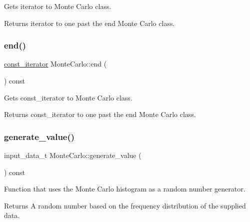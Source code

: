 Gets iterator to Monte Carlo class. \begin{DoxyReturn}{Returns}
iterator to one past the end Monte Carlo class. 
\end{DoxyReturn}
\mbox{\label{classMonteCarlo_a6e15e3a5a96163b8cc84ec9892c2e88b}} 
\subsubsection{\texorpdfstring{end()}{end()}\hspace{0.1cm}{\footnotesize\ttfamily [2/2]}}
{\footnotesize\ttfamily \hyperlink{classMonteCarlo_a74dc0884e3b02002956de4fb84a0bb01}{const\+\_\+iterator} Monte\+Carlo\+::end (\begin{DoxyParamCaption}{ }\end{DoxyParamCaption}) const\hspace{0.3cm}{\ttfamily [inline]}}

Gets const\+\_\+iterator to Monte Carlo class. \begin{DoxyReturn}{Returns}
const\+\_\+iterator to one past the end Monte Carlo class. 
\end{DoxyReturn}
\mbox{\label{classMonteCarlo_a32ac50ed9ba5bf78398681192ccfc301}} 
\subsubsection{\texorpdfstring{generate\+\_\+value()}{generate\_value()}}
{\footnotesize\ttfamily input\+\_\+data\+\_\+t Monte\+Carlo\+::generate\+\_\+value (\begin{DoxyParamCaption}{ }\end{DoxyParamCaption}) const}

Function that uses the Monte Carlo histogram as a random number generator. \begin{DoxyReturn}{Returns}
A random number based on the frequency distribution of the supplied data. 
\end{DoxyReturn}
\mbox{\label{classMonteCarlo_a21d7ee80b6b7fb92e620008754934541}} 
